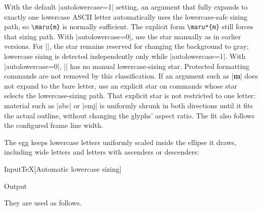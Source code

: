 \documentclass[luatex,fontsize=8pt,paper=b5,twoside]{jlreq}%
\begin{document}
With the default \KKverb|autolowercase=1| setting, an argument that fully
expands to exactly one lowercase ASCII letter automatically uses the
lowercase-safe sizing path, so
\verb|\maru{m}| is normally sufficient. The explicit form \verb|\maru*{m}|
still forces that sizing path. With \KKverb|autolowercase=0|, use the star
manually as in earlier versions. For \KKverb|\jegg|, the star remains reserved
for changing the background to gray; lowercase sizing is detected
independently only while \KKverb|autolowercase=1|. With
\KKverb|autolowercase=0|, \KKverb|\jegg| has no manual lowercase-sizing star.
Protected formatting commands are not removed by this classification. If an
argument such as \KKverb|\textbf{m}| does not expand to the bare letter, use an
explicit star on commands whose star selects the lowercase-sizing path.
That explicit star is not restricted to one letter: material such as
\KKverb|abc| or \KKverb|cmj| is uniformly shrunk in both directions until it
fits the actual outline, without changing the glyphs' aspect ratio. The fit
also follows the configured frame line width.

The egg keeps lowercase letters uniformly scaled inside the ellipse it draws,
including wide letters and letters with ascenders or descenders:

\begin{quotation}
  \quad{}\quad{}\quad
  \quad{}
\end{quotation}

\begin{SourceCode}{Input}{TeX}[Automatic lowercase sizing]


\end{SourceCode}

\begin{OutPut}{Output}


\end{OutPut}

They are used as follows.
\end{document}
